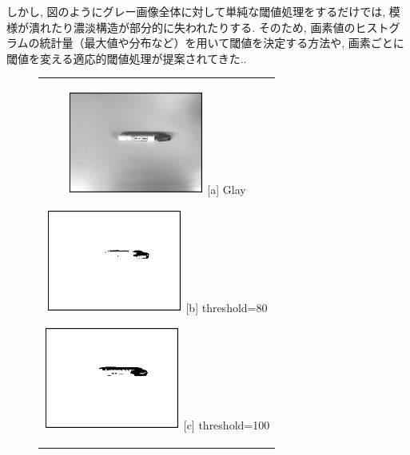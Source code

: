 \documentclass{suribt}
\begin{document}
しかし, 図のようにグレー画像全体に対して単純な閾値処理をするだけでは, 模様が潰れたり濃淡構造が部分的に失われたりする. そのため, 画素値のヒストグラムの統計量（最大値や分布など）を用いて閾値を決定する方法や, 画素ごとに閾値を変える適応的閾値処理が提案されてきた.\cite{Otsu-1979, Bradley-2007}.

\begin{figure} [htbp]
	\begin{center}
		\begin{tabular}{c}
		
		\begin{minipage}{0.33\hsize}
			\begin{center}
				\includegraphics[clip, width=4.5cm]{./figure/pen_glay.eps}
				\hspace{1.6cm} [a] Glay
			\end{center}
		\end{minipage}
		
		\begin{minipage}{0.33\hsize}
			\begin{center}
				\includegraphics[clip, width=4.5cm]{./figure/pen_thresh_80.eps}
				\hspace{1.6cm} [b] threshold=80
			\end{center}
		\end{minipage}
		
		\begin{minipage}{0.33\hsize}
			\begin{center}
				\includegraphics[clip, width=4.5cm]{./figure/pen_thresh_100.eps}
				\hspace{1.6cm} [c] threshold=100
			\end{center}
		\end{minipage} \\
		

\end{tabular}
\end{center}
\end{figure}
\end{document}
